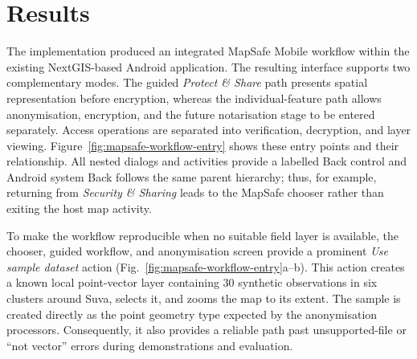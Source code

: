 %
\providecommand{\mapsafefigdir}{screenshots}

\section{Results}
\label{sec:mapsafe-results}

The implementation produced an integrated MapSafe Mobile workflow within the
existing NextGIS-based Android application.  The resulting interface supports
two complementary modes.  The guided \emph{Protect \& Share} path presents
spatial representation before encryption, whereas the individual-feature path
allows anonymisation, encryption, and the future notarisation stage to be
entered separately.  Access operations are separated into verification,
decryption, and layer viewing.  Figure~\ref{fig:mapsafe-workflow-entry} shows
these entry points and their relationship.  All nested dialogs and activities
provide a labelled Back control and Android system Back follows the same parent
hierarchy; thus, for example, returning from \emph{Security \& Sharing} leads to
the MapSafe chooser rather than exiting the host map activity.

To make the workflow reproducible when no suitable field layer is available,
the chooser, guided workflow, and anonymisation screen provide a prominent
\emph{Use sample dataset} action (Fig.~\ref{fig:mapsafe-workflow-entry}a--b).
This action creates a known local point-vector layer containing 30 synthetic
observations in six clusters around Suva, selects it, and zooms the map to its
extent.  The sample is created directly as the point geometry type expected by
the anonymisation processors.  Consequently, it also provides a reliable path
past unsupported-file or ``not vector'' errors during demonstrations and
evaluation.

